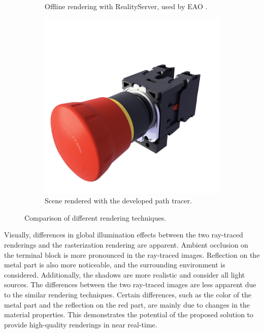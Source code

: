 \begin{figure}[H]
\begin{subfigure}[t]{0.3\textwidth}
    \caption{Offline rendering with \gls{RealityServer}, used by EAO \cite{eaoProductReference}.}
    \label{fig:offline-rendering}
  \end{subfigure}
  \hfill
  \begin{subfigure}[t]{0.3\textwidth}
    \includegraphics[width=\textwidth]{resources/comparison-strahl-rendering.png}
    \caption{Scene rendered with the developed path tracer.}
    \label{fig:strahl-rendering}
  \end{subfigure}
  \caption{Comparison of different rendering techniques.}
  \label{fig:final-rendering-comparison}
\end{figure}

Visually, differences in global illumination effects between the two ray-traced renderings and the rasterization rendering are apparent. Ambient occlusion on the terminal block is more pronounced in the ray-traced images. Reflection on the metal part is also more noticeable, and the surrounding environment is considered. Additionally, the shadows are more realistic and consider all light sources. The differences between the two ray-traced images are less apparent due to the similar rendering techniques. Certain differences, such as the color of the metal part and the reflection on the red part, are mainly due to changes in the material properties. This demonstrates the potential of the proposed solution to provide high-quality renderings in near real-time.


